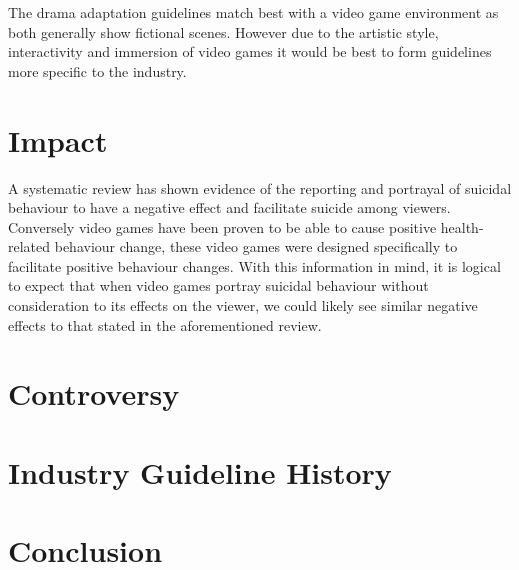 \documentclass{scrartcl}
\begin{document}
		The drama adaptation guidelines match best with a video game environment as both generally show fictional scenes. However due to the artistic style, interactivity and immersion of video games it would be best to form guidelines more specific to the industry. 	



	
	\section{Impact}
		A systematic review\cite{pirkis2001suicide} has shown evidence of the reporting and portrayal of suicidal behaviour to have a negative effect and facilitate suicide among viewers. Conversely video games have been proven to be able to cause positive health-related behaviour change\cite{baranowski2008playing}, these video games were designed specifically to facilitate positive behaviour changes. With this information in mind, it is logical to expect that when video games portray suicidal behaviour without consideration to its effects on the viewer, we could likely see similar negative effects to that stated in the aforementioned review\cite{pirkis2001suicide}.
		
	\section{Controversy}
	\section{Industry Guideline History}
	
	\section{Conclusion}

	
	
	
\end{document}
